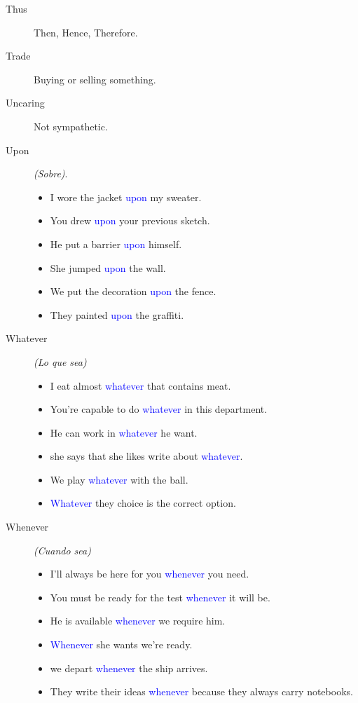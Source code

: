 \begin{multicols}{2}
\begin{description}
\item[Thus] Then, Hence, Therefore.

\item[Trade] Buying or selling something.

\item[Uncaring] Not sympathetic.

\item[Upon] \emph{(Sobre)}.
\begin{itemize}
\item I wore the jacket \textcolor{blue}{upon} my sweater.
\item You drew \textcolor{blue}{upon} your previous sketch.
\item He put a barrier \textcolor{blue}{upon} himself.
\item She jumped \textcolor{blue}{upon} the wall.
\item We put the decoration \textcolor{blue}{upon} the fence.
\item They painted \textcolor{blue}{upon} the graffiti.
\end{itemize}

\item[Whatever] \emph{(Lo que sea)}
\begin{itemize}
\item I eat almost \textcolor{blue}{whatever} that contains meat.
\item You're capable to do \textcolor{blue}{whatever} in this department.
\item He can work in \textcolor{blue}{whatever} he want.
\item she says that she likes write about \textcolor{blue}{whatever}.
\item We play \textcolor{blue}{whatever} with the ball.
\item \textcolor{blue}{Whatever} they choice is the correct option.
\end{itemize}

\item[Whenever] \emph{(Cuando sea)}
\begin{itemize}
\item I'll always be here for you \textcolor{blue}{whenever} you need.
\item You must be ready for the test \textcolor{blue}{whenever} it will be.
\item He is available \textcolor{blue}{whenever} we require him.
\item \textcolor{blue}{Whenever} she wants we're ready.
\item we depart \textcolor{blue}{whenever} the ship arrives.
\item They write their ideas \textcolor{blue}{whenever} because they always carry notebooks.
\end{itemize}


\end{description}
\end{multicols}
